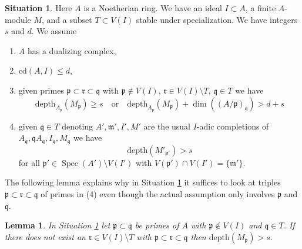 \documentclass{stacks-project}
\theoremstyle{plain}
\newtheorem{lemma}[subsection]{Lemma}
\theoremstyle{definition}
\newtheorem{situation}[subsection]{Situation}
\theoremstyle{remark}
\numberwithin{equation}{subsection}
\def\Spec{\mathop{\mathrm{Spec}}}
\begin{document}
\begin{situation}
\label{situation-bootstrap}
Here $A$ is a Noetherian ring. We have an ideal $I \subset A$,
a finite $A$-module $M$, and a subset $T \subset V(I)$ stable under
specialization. We have integers $s$ and $d$. We assume
\begin{enumerate}
\item[(1)] $A$ has a dualizing complex,
\item[(3)] $\text{cd}(A, I) \leq d$,
\item[(4)] given primes $\mathfrak p \subset \mathfrak r \subset \mathfrak q$
with $\mathfrak p \not \in V(I)$,
$\mathfrak r \in V(I) \setminus T$,
$\mathfrak q \in T$ we have
$$
\text{depth}_{A_\mathfrak p}(M_\mathfrak p) \geq s
\quad\text{or}\quad
\text{depth}_{A_\mathfrak p}(M_\mathfrak p) +
\dim((A/\mathfrak p)_\mathfrak q) > d + s
$$
\item[(6)] given $\mathfrak q \in T$ denoting
$A', \mathfrak m', I', M'$ are the usual $I$-adic completions
of $A_\mathfrak q, \mathfrak qA_\mathfrak q, I_\mathfrak q, M_\mathfrak q$
we have
$$
\text{depth}(M'_{\mathfrak p'}) > s
$$
for all $\mathfrak p' \in \Spec(A') \setminus V(I')$ with
$V(\mathfrak p') \cap V(I') = \{\mathfrak m'\}$.
\end{enumerate}
\end{situation}

\noindent
The following lemma explains why in Situation \ref{situation-bootstrap}
it suffices to look at triples
$\mathfrak p \subset \mathfrak r \subset \mathfrak q$ of primes in (4)
even though the actual assumption only involves $\mathfrak p$ and $\mathfrak q$.

\begin{lemma}
\label{lemma-helper-bootstrap}
In Situation \ref{situation-bootstrap} let $\mathfrak p \subset \mathfrak q$
be primes of $A$ with $\mathfrak p \not \in V(I)$ and
$\mathfrak q \in T$. If there does not exist an
$\mathfrak r \in V(I) \setminus T$ with
$\mathfrak p \subset \mathfrak r \subset \mathfrak q$
then $\text{depth}(M_\mathfrak p) > s$.
\end{lemma}
\end{document}
